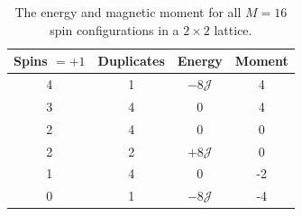 \documentclass[12pt]{article}
\numberwithin{figure}{section}
\numberwithin{table}{section}
\begin{document}
\begin{table}[ht]
\begin{center}
  \begin{tabular}{| c | c | c | c |}
  	\hline
  	Spins $=+1$ & Duplicates & Energy & Moment \\[0.05cm] \hline\hline
     4 & 1 & $-8\mathcal{J}$ & 4\\[0.10cm]
     3 & 4 & $0$ & 4\\[0.10cm]
     2 & 4 & $0$ & 0\\[0.10cm]
     2 & 2 & $+8\mathcal{J}$ & 0\\[0.10cm]
     1 & 4 & $0$ & -2\\[0.10cm]
     0 & 1 & $-8\mathcal{J}$ & -4\\[0.10cm]
     \hline
  \end{tabular}
\end{center}
\caption{The energy and magnetic moment for all $M=16$ spin configurations in a $2\times2$ lattice.}
\label{tab:2x2}
\end{table}
\end{document}
